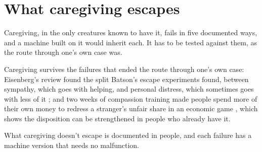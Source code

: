 \section{What caregiving escapes}
\label{sec:20.6}
Caregiving, in the only creatures known to have it, fails in five documented ways, and a machine built on it would inherit each. It has to be tested against them, as the route through one's own case was.

Caregiving survives the failures that ended the route through one's own case: Eisenberg's review found the split Batson's escape experiments found, between sympathy, which goes with helping, and personal distress, which sometimes goes with less of it \autocite{eisenberg1990empathy}; and two weeks of compassion training made people spend more of their own money to redress a stranger's unfair share in an economic game \autocite{weng2013compassion}, which shows the disposition can be strengthened in people who already have it.

What caregiving doesn't escape is documented in people, and each failure has a machine version that needs no malfunction.
